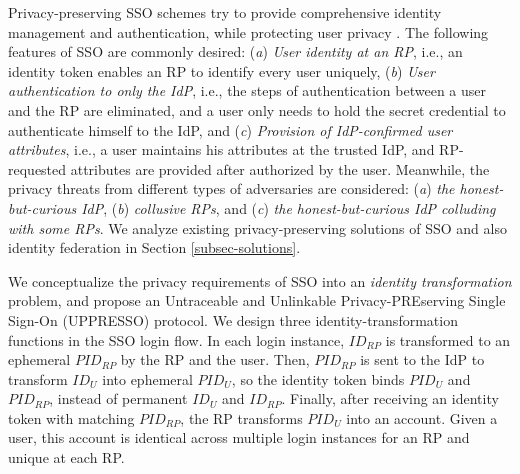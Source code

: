 Privacy-preserving SSO schemes try to provide comprehensive identity management and authentication,
    while protecting user privacy \cite{maler2008venn,NIST2017draft,BrowserID,SPRESSO}.
The following features of SSO are commonly desired:
(\emph{a}) \emph{User identity at an RP},
    i.e., an identity token enables an RP to identify every user uniquely,
(\emph{b}) \emph{User authentication to only the IdP}, i.e.,
    the steps of authentication between a user and the RP are eliminated,
    and a user only needs to hold the secret credential to authenticate himself to the IdP,
and (\emph{c}) \emph{Provision of IdP-confirmed user attributes},
    i.e., a user maintains his attributes at the trusted IdP,
    and RP-requested attributes are provided %
            after authorized by the user.
Meanwhile,
    the privacy threats from different types of adversaries are considered:
    (\emph{a}) \emph{the honest-but-curious IdP},
    (\emph{b}) \emph{collusive RPs},
    and (\emph{c}) \emph{the honest-but-curious IdP colluding with some RPs}.
We analyze existing privacy-preserving solutions of SSO and also identity federation
in Section \ref{subsec-solutions}.



We conceptualize the privacy requirements of SSO into
  an {\em identity transformation} problem, %
and propose an Untraceable and Unlinkable Privacy-PREserving Single Sign-On (UPPRESSO) protocol.
We design three identity-transformation functions in the SSO login flow.
In each login instance,
        $ID_{RP}$ is transformed to an ephemeral $PID_{RP}$  by the RP and the user.
Then, $PID_{RP}$ is sent to the IdP to transform $ID_U$ into ephemeral $PID_U$,
    so the identity token binds $PID_U$ and $PID_{RP}$, instead of permanent $ID_U$ and $ID_{RP}$.
Finally,
    after receiving an identity token with matching $PID_{RP}$,
        the RP transforms $PID_U$ into an account.
Given a user, this account is identical across multiple login instances for an RP
     and unique at each RP.


